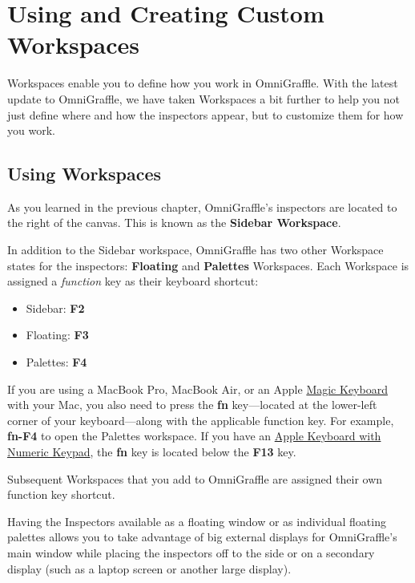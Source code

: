\documentclass[../main.tex]{subfiles}
\begin{document}
\chapter{Using and Creating Custom Workspaces}

Workspaces enable you to define how you work in OmniGraffle. With the latest update to
OmniGraffle, we have taken Workspaces a bit further to help you not just define where and how
the inspectors appear, but to customize them for how you work.

\section{Using Workspaces}

As you learned in the previous chapter, OmniGraffle's inspectors are located to the right of the
canvas. This is known as the \textbf{Sidebar Workspace}.


In addition to the Sidebar workspace, OmniGraffle has two other Workspace states for the
inspectors: \textbf{Floating} and \textbf{Palettes} Workspaces. Each Workspace is assigned a
\textit{function} key as their keyboard shortcut:

\begin{itemize}
  \item Sidebar: \textbf{F2}
  \item Floating: \textbf{F3}
  \item Palettes: \textbf{F4}
\end{itemize}

If you are using a MacBook Pro, MacBook Air, or an Apple
\href{http://www.apple.com/shop/product/MLA22LL/A/magic-keyboard-us-english?fnode=56}{Magic
Keyboard} with your Mac, you also need to press the \textbf{fn} key---located at the
lower-left corner of your keyboard---along with the applicable function key. For example,
\textbf{fn-F4} to open the Palettes workspace. If you have an
\href{http://www.apple.com/shop/product/MB110LL/B/apple-keyboard-with-numeric-keypad-us-english?fnode=56}{Apple
Keyboard with Numeric Keypad}, the \textbf{fn} key is located below the \textbf{F13} key.

Subsequent Workspaces that you add to OmniGraffle are assigned their own function key shortcut.

\begin{ogtip}
  Having the Inspectors available as a floating window or as individual floating palettes allows
  you to take advantage of big external displays for OmniGraffle's main window while placing the
  inspectors off to the side or on a secondary display (such as a laptop screen or another large
  display).
\end{ogtip}
\end{document}
